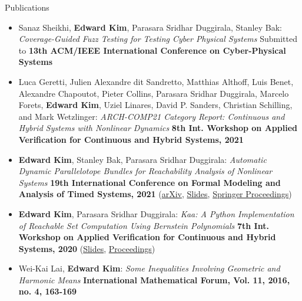 \documentclass{resume} %
\begin{document}
\begin{rSection}{Publications}
  \begin{itemize}[leftmargin=*]
    \item Sanaz Sheikhi, {\bf Edward Kim}, Parasara Sridhar Duggirala, Stanley Bak: \newline
    \textit{Coverage-Guided Fuzz Testing for Testing Cyber Physical Systems} \newline
    Submitted to {\bf 13th ACM/IEEE International Conference on Cyber-Physical Systems}

    \item  Luca Geretti, Julien Alexandre dit Sandretto, Matthias Althoff, Luis Benet, Alexandre Chapoutot, Pieter Collins, Parasara Sridhar Duggirala, Marcelo Forets, {\bf Edward Kim}, Uziel Linares, David P. Sanders, Christian Schilling, and Mark Wetzlinger: \newline
    \textit{ARCH-COMP21 Category Report: Continuous and Hybrid Systems with Nonlinear Dynamics} \newline
    {\bf 8th Int. Workshop on Applied Verification for Continuous and Hybrid Systems, 2021}

    \item {\bf Edward Kim}, Stanley Bak, Parasara Sridhar Duggirala: \newline
    \textit{Automatic Dynamic Parallelotope Bundles for Reachability Analysis of Nonlinear Systems} \newline
    {\bf 19th International Conference on Formal Modeling and Analysis of Timed Systems, 2021} \newline
    (\href{https://arxiv.org/abs/2105.11796}{arXiv}, \href{https://ekim1919.github.io/files/formats21.pdf)}{Slides}, \href{https://link.springer.com/book/10.1007/978-3-030-85037-1}{Springer Proceedings})

    \item {\bf Edward Kim}, Parasara Sridhar Duggirala: \newline
    \textit{Kaa: A Python Implementation of Reachable Set Computation Using Bernstein Polynomials} \newline
    {\bf 7th Int. Workshop on Applied Verification for Continuous and Hybrid Systems, 2020} \newline
    (\href{https://ekim1919.github.io/files/ARCH2020.pdf}{Slides}, \href{https://easychair.org/publications/volume/ARCH20}{Proceedings})

    \item Wei-Kai Lai, {\bf Edward Kim}: \newline
    \textit{Some Inequalities Involving Geometric and Harmonic Means} \newline
    {\bf International Mathematical Forum, Vol. 11, 2016, no. 4, 163-169}
  \end{itemize}
\end{rSection}
\end{document}
